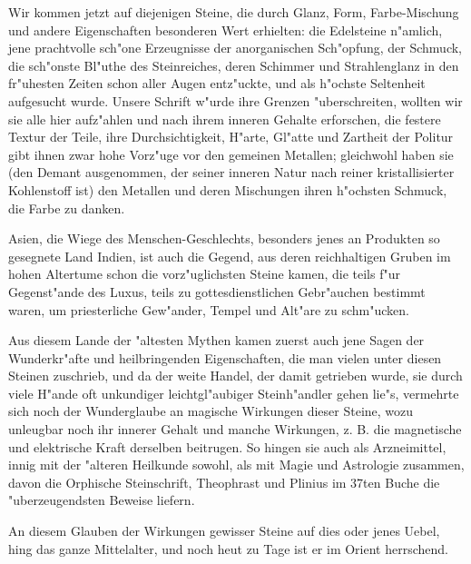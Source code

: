 \documentclass[a4paper, 11pt, oneside, polutonikogreek, german]{article}
\begin{document}
Wir kommen jetzt auf diejenigen Steine, die durch Glanz, Form, Farbe-Mischung und andere Eigenschaften besonderen Wert erhielten: die Edelsteine n"amlich, jene prachtvolle sch"one Erzeugnisse der anorganischen Sch"opfung, der Schmuck, die sch"onste Bl"uthe des Steinreiches, deren Schimmer und Strahlenglanz in den fr"uhesten Zeiten schon aller Augen entz"uckte, und als h"ochste Seltenheit aufgesucht wurde. Unsere Schrift w"urde ihre Grenzen "uberschreiten, wollten wir sie alle hier aufz"ahlen und nach ihrem inneren Gehalte erforschen, die festere Textur der Teile, ihre Durchsichtigkeit, H"arte, Gl"atte und Zartheit der Politur gibt ihnen zwar hohe Vorz"uge vor den gemeinen Metallen; gleichwohl haben sie (den Demant ausgenommen, der seiner inneren Natur nach reiner kristallisierter Kohlenstoff ist) den Metallen und deren Mischungen ihren h"ochsten Schmuck, die Farbe zu danken.

Asien, die Wiege des Menschen-Geschlechts, besonders jenes an Produkten so gesegnete Land Indien, ist auch die Gegend, aus deren reichhaltigen Gruben im hohen Altertume schon die vorz"uglichsten Steine kamen, die teils f"ur Gegenst"ande des Luxus, teils zu gottesdienstlichen Gebr"auchen bestimmt waren, um priesterliche Gew"ander, Tempel und Alt"are zu schm"ucken.

Aus diesem Lande der "altesten Mythen kamen zuerst auch jene Sagen der Wunderkr"afte und heilbringenden Eigenschaften, die man vielen unter diesen Steinen zuschrieb, und da der weite Handel, der damit getrieben wurde, sie durch viele H"ande oft unkundiger leichtgl"aubiger Steinh"andler gehen lie"s, vermehrte sich noch der Wunderglaube an magische Wirkungen dieser Steine, wozu unleugbar noch ihr innerer Gehalt und manche Wirkungen, z. B. die magnetische und elektrische Kraft derselben beitrugen. So hingen sie auch als Arzneimittel, innig mit der "alteren Heilkunde sowohl, als mit Magie und Astrologie zusammen, davon die Orphische Steinschrift, Theophrast und Plinius im 37ten Buche die "uberzeugendsten Beweise liefern.

An diesem Glauben der Wirkungen gewisser Steine auf dies oder jenes Uebel, hing das ganze Mittelalter, und noch heut zu Tage ist er im Orient herrschend.
\end{document}
